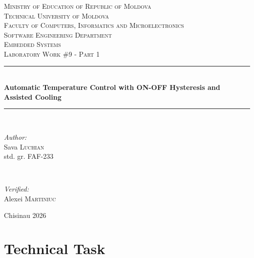 \documentclass[12pt]{article}
\begin{document}
\begin{titlepage}
  \begin{center}
    \textsc{\large Ministry of Education of Republic of Moldova}\\[0.5cm]
    \textsc{\large Technical University of Moldova}\\[0.5cm]
    \textsc{\large Faculty of Computers, Informatics and Microelectronics}\\[0.5cm]
    \textsc{\large Software Engineering Department}\\[1.2cm]

    \vspace{20mm}
    \textsc{\Large Embedded Systems}\\[0.5cm]
    \textsc{\large Laboratory Work \#9 - Part 1}\\[0.5cm]

    \newcommand{\HRule}{\rule{\linewidth}{0.5mm}}
    \vspace{8mm}
    \HRule\\[0.4cm]
    {\LARGE \bfseries Automatic Temperature Control with ON-OFF Hysteresis and Assisted Cooling\\[0.3cm]}
    \HRule\\[1.5cm]

    \begin{minipage}[t]{0.45\textwidth}
      \begin{flushleft}\large
        \emph{Author:}\\
        Sava \textsc{Luchian}\\
        std. gr. FAF-233
      \end{flushleft}
    \end{minipage}
    ~
    \begin{minipage}[t]{0.45\textwidth}
      \begin{flushright}\large
        \emph{Verified:}\\
        Alexei \textsc{Martiniuc}
      \end{flushright}
    \end{minipage}

    \vspace*{\fill}
    \large Chisinau 2026
  \end{center}
\end{titlepage}

\setcounter{page}{2}
\pagestyle{fancy}
\fancyhf{}
\rhead{\thepage}

\section*{Technical Task}
\end{document}
